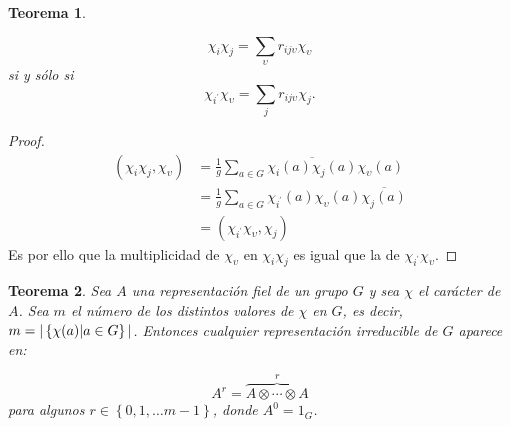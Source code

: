 \documentclass[12pt]{book}
\newtheorem{theorem}{Teorema}[section]
\theoremstyle{definition}
\newcounter{in}
\begin{document}
\begin{theorem}
  \label{t6_2}
  
\begin{equation*}
  \chi_{i} \chi_{j} = \sum_{\upsilon} r_{ij \upsilon} \chi_{\upsilon}
\end{equation*}
si y sólo si
\begin{equation*}
  \chi_{i^{'}}\chi_{\upsilon} =  \sum_{j} r_{ij \upsilon} \chi_{j}.
\end{equation*}
\end{theorem}
\begin{proof}
  \begin{equation}
    \label{eq:5}
    \begin{aligned}
      (\chi_{i} \chi_{j}, \chi_{\upsilon}) &= \frac{1}{g} \sum_{a \in G} \overline{\chi_{i}(a) \chi_{j}(a)} \chi_{\upsilon}(a) \\
      & = \frac{1}{g} \sum_{a \in G} \chi_{i^{'}}(a) \chi_{\upsilon}(a) \overline{\chi_{j}(a)} \\
      & = (\chi_{i^{'}} \chi_{\upsilon},\chi_{j})
    \end{aligned}
  \end{equation}
  Es por ello que la multiplicidad de $\chi_{\upsilon}$ en
  $\chi_{i} \chi_{j}$ es igual que la de
  $\chi_{i^{'}} \chi_{\upsilon}$.  
\end{proof}
\begin{theorem}
  \label{t6_3}
  Sea $A$ una representación fiel de un grupo $G$ y sea $\chi$ el
  carácter de $A$. Sea $m$ el número de los distintos valores de
  $\chi$ en $G$, es decir,~$m = | \left\{ \chi(a) \arrowvert a \in G \right\}
  |$. Entonces cualquier representación irreducible de $G$ aparece en:

  \begin{equation*}
    A^{r}=  \overbrace{A \otimes \cdots \otimes A}^{r}
  \end{equation*}
  para algunos $r \in \left\{ 0, 1, \ldots m-1 \right\}$, donde $A^{0}=1_{G}$.
\end{theorem}
\end{document}
